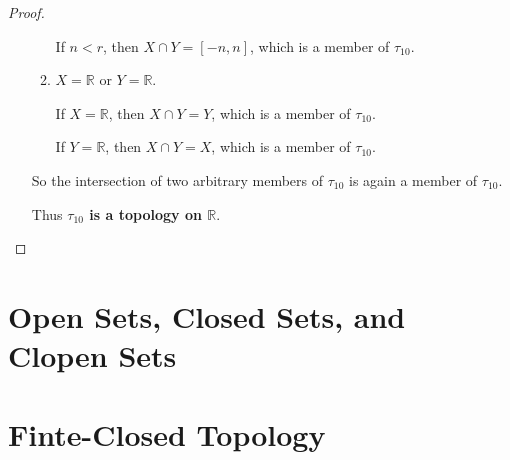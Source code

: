 \begin{proof}
\begin{enumerate}[label={(\roman*)}]
\begin{enumerate}[label={\textbf{Case \arabic*.}},itemindent=1cm]
			            If $n < r$, then $X\cap Y = [-n, n]$, which is a member of $\tau_{10}$.
			      \item $X = \mathbb{R}$ or $Y = \mathbb{R}$.

			            If $X = \mathbb{R}$, then $X\cap Y = Y$, which is a member of $\tau_{10}$.

			            If $Y = \mathbb{R}$, then $X\cap Y = X$, which is a member of $\tau_{10}$.
		      \end{enumerate}

		      So the intersection of two arbitrary members of $\tau_{10}$ is again a member of $\tau_{10}$.

		      Thus \textbf{$\tau_{10}$ is a topology on $\mathbb{R}$}.
	\end{enumerate}
\end{proof}

\section{Open Sets, Closed Sets, and Clopen Sets}



\section{Finte-Closed Topology}



